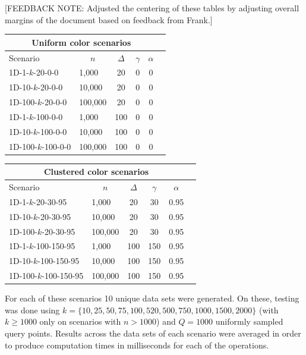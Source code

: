 \documentclass{article}
\newcommand{\fbnote}[1]{{\color{blue}[FEEDBACK NOTE: #1]\\}}
\begin{document}
\fbnote{Adjusted the centering of these tables by adjusting overall margins of the document based on feedback from Frank.}
\begin{center}
    \begin{tabular}{|l||l|c|c|c|c|}
    \hline
    \multicolumn{5}{|c|}{Uniform color scenarios}                 \\
    \hline
    Scenario           & \multicolumn{1}{|c|}{$n$}     & $\Delta$ & $\gamma$ & $\alpha$ \\
    \hline
    1D-1-$k$-20-0-0    & 1,000   & 20       & 0        & 0        \\
    1D-10-$k$-20-0-0   & 10,000  & 20       & 0        & 0        \\
    1D-100-$k$-20-0-0  & 100,000 & 20       & 0        & 0        \\
    1D-1-$k$-100-0-0   & 1,000   & 100      & 0        & 0        \\
    1D-10-$k$-100-0-0  & 10,000  & 100      & 0        & 0        \\
    1D-100-$k$-100-0-0 & 100,000 & 100      & 0        & 0        \\
    \hline
\end{tabular}
\:\:
\begin{tabular}{|l||l|c|c|c|c|}
    \hline
    \multicolumn{5}{|c|}{Clustered color scenarios}                  \\
    \hline
    Scenario              & \multicolumn{1}{|c|}{$n$}     & $\Delta$ & $\gamma$ & $\alpha$ \\
    \hline
    1D-1-$k$-20-30-95     & 1,000   & 20       & 30       & 0.95     \\
    1D-10-$k$-20-30-95    & 10,000  & 20       & 30       & 0.95     \\
    1D-100-$k$-20-30-95   & 100,000 & 20       & 30       & 0.95     \\
    1D-1-$k$-100-150-95   & 1,000   & 100      & 150      & 0.95     \\
    1D-10-$k$-100-150-95  & 10,000  & 100      & 150      & 0.95     \\
    1D-100-$k$-100-150-95 & 100,000 & 100      & 150      & 0.95     \\
    \hline
\end{tabular}
\end{center}
For each of these scenarios 10 unique data sets were generated. On these, testing was done using $k=\{10, 25, 50, 75, 100, 520, 500, 750, 1000, 1500, 2000\}$ (with $k\geq1000$ only on scenarios with $n > 1000$) and $Q=1000$ uniformly sampled query points. Results across the data sets of each scenario were averaged in order to produce computation times in milliseconds for each of the operations. \\\\
\end{document}
